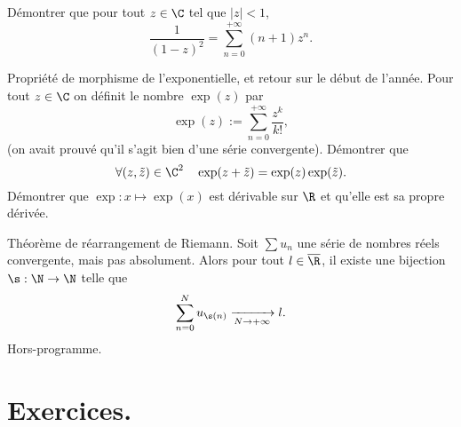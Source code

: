 \documentclass[11pt]{article}
\begin{document}
\begin{ex}{}{}
    Démontrer que pour tout $z\in\C$ tel que $|z|<1$,
    \begin{equation*}
        \frac{1}{(1-z)^2}=\sum_{n=0}^{+\infty}(n+1)z^n.
    \end{equation*}
\end{ex}

\begin{ex}{Propriété de morphisme de l'exponentielle, et retour sur le début de l'année.}{}
    Pour tout $z\in\C$ on définit le nombre $\exp(z)$ par
    \begin{equation*}
        \exp(z):=\sum_{n=0}^{+\infty}\frac{z^k}{k!},
    \end{equation*}
    (on avait prouvé qu'il s'agit bien d'une série convergente).\n
    Démontrer que
    \begin{equation*}
        \forall (z,\tilde{z})\in\C^2\quad\exp(z+\tilde{z})=\exp(z)\exp(\tilde{z}).
    \end{equation*}
    Démontrer que $\exp:x\mapsto\exp(x)$ est dérivable sur $\R$ et qu'elle est sa propre dérivée.
\end{ex}

\pagebreak

\begin{thm}{Théorème de réarrangement de Riemann.}{}
    Soit $\sum u_n$ une série de nombres réels convergente, mais pas absolument. Alors pour tout $l\in\overline{\R}$, il existe une bijection $\s:\N\to\N$ telle que \begin{equation*}\sum_{n=0}^Nu_{\s(n)}\xrightarrow[N\to+\infty]{}l.\end{equation*}
    \tcblower
    Hors-programme.
\end{thm}

\section{Exercices.}
\end{document}

